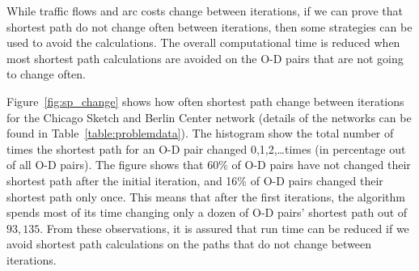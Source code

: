 While traffic flows and arc costs change between iterations,
if we can prove that shortest path do not change often between iterations,
then some strategies can be used to avoid the calculations.
The overall computational time is reduced when most shortest path calculations are avoided on the O-D pairs that are not going to change often.

Figure~\ref{fig:sp_change} shows how often shortest path change between iterations for the Chicago Sketch and Berlin Center network (details of the networks can be found in Table~\ref{table:problemdata}).
The histogram show the total number of times the shortest path for an O-D pair changed 0,1,2,\ldots times (in percentage out of all O-D pairs).
The figure shows that 60\% of O-D pairs have not changed their shortest path after the initial iteration,
and 16\% of O-D pairs changed their shortest path only once.
This means that after the first iterations,
the algorithm spends most of its time changing only a dozen of O-D pairs' shortest path out of $93{,}135$.
From these observations,
it is assured that run time can be reduced if we avoid shortest path calculations on the paths that do not change between iterations.

